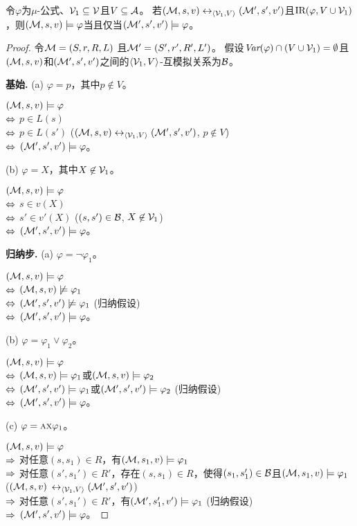 \begin{proposition}[不变性]
	\label{pro:variB}
	令$\varphi$为$\mu$-公式、${\cal V}_1\subseteq {\cal V}$且$V\subseteq {\cal A}$。 若$({\cal M}, s, v) \leftrightarrow_{{\langle{{\cal V}_1, V}\rangle}} ({\cal M}', s', v')$且$\textrm{IR}(\varphi, V \cup {\cal V}_1)$，则$({\cal M},s, v) \models \varphi$当且仅当$({\cal M}',s', v') \models \varphi$。
\end{proposition}
\begin{proof}
	令${\cal M}=(S,r,R,L)$ 且${\cal M}'=(S',r',R',L')$。
假设$\textit{Var}(\varphi) \cap (V\cup {\cal V}_1) = \emptyset$且$({\cal M}, s, v)$和$({\cal M}', s', v')$之间的${{\langle{{\cal V}_1, V}\rangle}}$-互模拟关系为${\cal B}$。
	
	\textbf{基始.} (a) $\varphi = p$，其中$p\not \in V$。
	
	$({\cal M},s,v) \models \varphi$\\
	$\Leftrightarrow$ $p \in L(s)$ \\
	$\Leftrightarrow$ $p\in L(s')$ \hfill ($({\cal M}, s, v) \leftrightarrow_{{\langle{{\cal V}_1, V}\rangle}} ({\cal M}', s', v')$, $p \not \in V$)\\
	$\Leftrightarrow$ $({\cal M}',s',v') \models \varphi$。
	
	(b) $\varphi = X$，其中$X \not \in {\cal V}_1$。
	
	$({\cal M},s, v)\models \varphi$ \\
	$\Leftrightarrow$ $s \in v(X)$ \\
	$\Leftrightarrow$ $s' \in v'(X)$ \hfill ($(s,s')\in {\cal B}$, $X\not \in {\cal V}_1$)\\
	$\Leftrightarrow$ $({\cal M}',s',v') \models \varphi$。
	
	\textbf{归纳步.} (a) $\varphi = \neg \varphi_1$。
	
	$({\cal M},s,v) \models \varphi$\\
	$\Leftrightarrow$ $({\cal M},s,v) \not \models \varphi_1$\\
	$\Leftrightarrow$ $({\cal M}',s',v') \not \models \varphi_1$ \hfill (归纳假设)\\
	$\Leftrightarrow$ $({\cal M}',s',v') \models \varphi$。
	
	(b) $\varphi = \varphi_1 \vee \varphi_2$。
	
	$({\cal M},s,v) \models \varphi$\\
	$\Leftrightarrow$ $({\cal M},s,v) \models \varphi_1$或$({\cal M},s,v)\models \varphi_2$ \\
	$\Leftrightarrow$ $({\cal M}',s',v') \models \varphi_1$或$({\cal M}',s',v') \models \varphi_2$ \hfill (归纳假设)\\
	$\Leftrightarrow$ $({\cal M}',s',v')\models \varphi$。
	
	(c)  $\varphi = \textsc{a}\textsc{x} \varphi_1$。
	
	$({\cal M},s,v) \models \varphi$\\
	$\Rightarrow$ 对任意$(s, s_1)\in R$，有$({\cal M},s_1,v) \models \varphi_1$\\
	$\Rightarrow$ 对任意$(s',s_1') \in R'$，存在$(s,s_1) \in R$，使得$(s_1,s_1') \in {\cal B}$且$({\cal M},s_1,v) \models \varphi_1$ \qquad ($({\cal M}, s, v)$ $\leftrightarrow_{{\langle{{\cal V}_1, V}\rangle}} ({\cal M}', s', v')$)\\
	$\Rightarrow$ 对任意$(s',s_1') \in R'$，有$({\cal M}',s_1',v')\models \varphi_1$  \hfill (归纳假设)\\
	$\Rightarrow$ $({\cal M}',s',v')\models \varphi$。
	

\end{proof}
